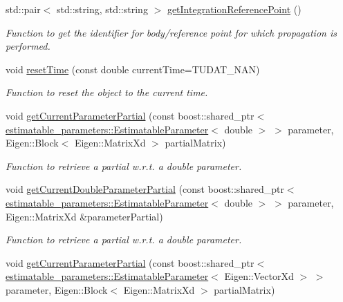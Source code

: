 \begin{DoxyCompactItemize}
std\+::pair$<$ std\+::string, std\+::string $>$ \hyperlink{classtudat_1_1orbit__determination_1_1StateDerivativePartial_adbe24dfd4085ec6343ccf18478b52bc0}{get\+Integration\+Reference\+Point} ()
\begin{DoxyCompactList}\small\item\em Function to get the identifier for body/reference point for which propagation is performed. \end{DoxyCompactList}\item 
void \hyperlink{classtudat_1_1orbit__determination_1_1StateDerivativePartial_a3654d540045886559b6592dc4f30bab8}{reset\+Time} (const double current\+Time=T\+U\+D\+A\+T\+\_\+\+N\+AN)
\begin{DoxyCompactList}\small\item\em Function to reset the object to the current time. \end{DoxyCompactList}\item 
void \hyperlink{classtudat_1_1orbit__determination_1_1StateDerivativePartial_a063eae4f13f0443b97c12d3f278c2a3b}{get\+Current\+Parameter\+Partial} (const boost\+::shared\+\_\+ptr$<$ \hyperlink{classtudat_1_1estimatable__parameters_1_1EstimatableParameter}{estimatable\+\_\+parameters\+::\+Estimatable\+Parameter}$<$ double $>$ $>$ parameter, Eigen\+::\+Block$<$ Eigen\+::\+Matrix\+Xd $>$ partial\+Matrix)
\begin{DoxyCompactList}\small\item\em Function to retrieve a partial w.\+r.\+t. a double parameter. \end{DoxyCompactList}\item 
void \hyperlink{classtudat_1_1orbit__determination_1_1StateDerivativePartial_a9b9ac9274de9f147642a8ed79660d1d7}{get\+Current\+Double\+Parameter\+Partial} (const boost\+::shared\+\_\+ptr$<$ \hyperlink{classtudat_1_1estimatable__parameters_1_1EstimatableParameter}{estimatable\+\_\+parameters\+::\+Estimatable\+Parameter}$<$ double $>$ $>$ parameter, Eigen\+::\+Matrix\+Xd \&parameter\+Partial)
\begin{DoxyCompactList}\small\item\em Function to retrieve a partial w.\+r.\+t. a double parameter. \end{DoxyCompactList}\item 
void \hyperlink{classtudat_1_1orbit__determination_1_1StateDerivativePartial_af78ddee684d7845f4d91aa45f73fe5cd}{get\+Current\+Parameter\+Partial} (const boost\+::shared\+\_\+ptr$<$ \hyperlink{classtudat_1_1estimatable__parameters_1_1EstimatableParameter}{estimatable\+\_\+parameters\+::\+Estimatable\+Parameter}$<$ Eigen\+::\+Vector\+Xd $>$ $>$ parameter, Eigen\+::\+Block$<$ Eigen\+::\+Matrix\+Xd $>$ partial\+Matrix)

\end{DoxyCompactItemize}
